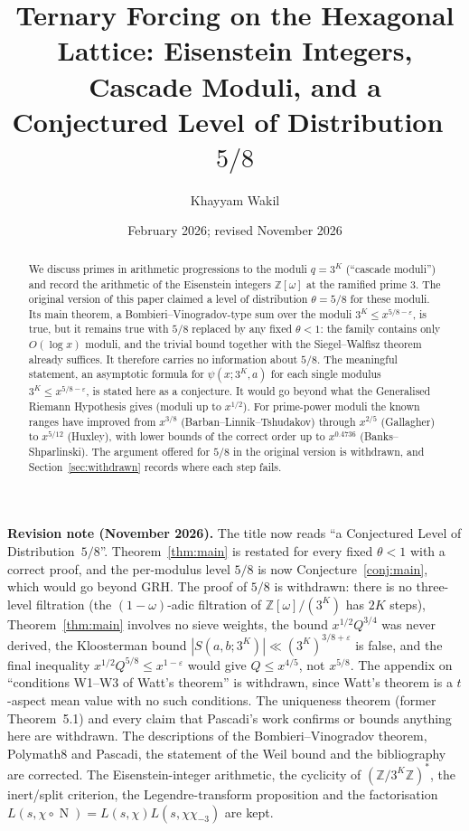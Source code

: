 \documentclass[12pt]{amsart}
\title[Ternary Forcing on the Hexagonal Lattice]{Ternary Forcing on the
  Hexagonal Lattice: Eisenstein Integers, Cascade Moduli, and a Conjectured
  Level of Distribution~$5/8$}
\author{Khayyam Wakil}
\date{February 2026; revised November 2026}
\theoremstyle{plain}
\theoremstyle{definition}
\newcommand{\Z}{\mathbb{Z}}
\newcommand{\Zomega}{\Z[\omega]}
\DeclareMathOperator{\N}{N}
\begin{document}
\begin{abstract}
We discuss primes in arithmetic progressions to the moduli $q = 3^K$
(``cascade moduli'') and record the arithmetic of the Eisenstein integers
$\Zomega$ at the ramified prime $3$. The original version of this paper
claimed a level of distribution $\theta = 5/8$ for these moduli. Its main
theorem, a Bombieri--Vinogradov-type sum over the moduli
$3^K \leq x^{5/8-\varepsilon}$, is true, but it remains true with $5/8$
replaced by any fixed $\theta < 1$: the family contains only $O(\log x)$
moduli, and the trivial bound together with the Siegel--Walfisz theorem
already suffices. It therefore carries no information about $5/8$. The
meaningful statement, an asymptotic formula for $\psi(x;3^K,a)$ for each
single modulus $3^K \leq x^{5/8-\varepsilon}$, is stated here as a
conjecture. It would go beyond what the Generalised Riemann Hypothesis gives
(moduli up to $x^{1/2}$). For prime-power moduli the known ranges have
improved from $x^{3/8}$ (Barban--Linnik--Tshudakov) through $x^{2/5}$
(Gallagher) to $x^{5/12}$ (Huxley), with lower bounds of the correct order up
to $x^{0.4736}$ (Banks--Shparlinski). The argument offered for $5/8$ in the original version
is withdrawn, and Section~\ref{sec:withdrawn} records where each step fails.
\end{abstract}

\maketitle

\noindent\textbf{Revision note (November 2026).}
The title now reads ``a Conjectured Level of Distribution~$5/8$''.
Theorem~\ref{thm:main} is restated for every fixed $\theta < 1$ with a
correct proof, and the per-modulus level $5/8$ is now
Conjecture~\ref{conj:main}, which would go beyond GRH. The proof of $5/8$ is
withdrawn: there is no three-level filtration (the $(1-\omega)$-adic
filtration of $\Zomega/(3^K)$ has $2K$ steps), Theorem~\ref{thm:main}
involves no sieve weights, the bound $x^{1/2}Q^{3/4}$ was never derived, the
Kloosterman bound $|S(a,b;3^K)| \ll (3^K)^{3/8+\varepsilon}$ is false, and the
final inequality $x^{1/2}Q^{5/8} \leq x^{1-\varepsilon}$ would give
$Q \leq x^{4/5}$, not $x^{5/8}$. The appendix on ``conditions W1--W3 of
Watt's theorem'' is withdrawn, since Watt's theorem is a $t$-aspect mean value
with no such conditions. The uniqueness theorem (former Theorem~5.1) and every
claim that Pascadi's work confirms or bounds anything here are withdrawn.
The descriptions of the Bombieri--Vinogradov theorem, Polymath8 and Pascadi,
the statement of the Weil bound and the bibliography are corrected. The
Eisenstein-integer arithmetic, the cyclicity of $(\Z/3^K\Z)^*$, the
inert/split criterion, the Legendre-transform proposition and the
factorisation $L(s,\chi\circ\N) = L(s,\chi)L(s,\chi\chi_{-3})$ are kept.
\end{document}
